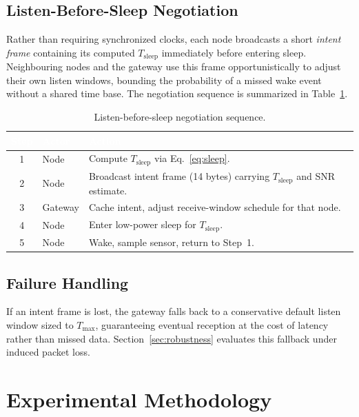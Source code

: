 \documentclass[12pt,a4paper]{report}
\begin{document}
\section{Listen-Before-Sleep Negotiation}
Rather than requiring synchronized clocks, each node broadcasts a short \emph{intent frame}
containing its computed $T_{\text{sleep}}$ immediately before entering sleep. Neighbouring
nodes and the gateway use this frame opportunistically to adjust their own listen windows,
bounding the probability of a missed wake event without a shared time base. The negotiation
sequence is summarized in Table~\ref{tab:negotiation}.

\begin{table}[H]
\centering
\caption{Listen-before-sleep negotiation sequence.}
\label{tab:negotiation}
\begin{tabularx}{\textwidth}{@{}clX@{}}
\toprule
\rowcolor{nustgreen}
\textcolor{white}{\bfseries Step} & \textcolor{white}{\bfseries Actor} & \textcolor{white}{\bfseries Action} \\
\midrule
1 & Node    & Compute $T_{\text{sleep}}$ via Eq.~\ref{eq:sleep}. \\
\rowcolor{nustmist}
2 & Node    & Broadcast intent frame (14 bytes) carrying $T_{\text{sleep}}$ and SNR estimate. \\
3 & Gateway & Cache intent, adjust receive-window schedule for that node. \\
\rowcolor{nustmist}
4 & Node    & Enter low-power sleep for $T_{\text{sleep}}$. \\
5 & Node    & Wake, sample sensor, return to Step~1. \\
\bottomrule
\end{tabularx}
\end{table}

\section{Failure Handling}
If an intent frame is lost, the gateway falls back to a conservative default listen window
sized to $T_{\max}$, guaranteeing eventual reception at the cost of latency rather than
missed data. Section~\ref{sec:robustness} evaluates this fallback under induced packet loss.

\chapter{Experimental Methodology}
\label{ch:exp}
\end{document}
